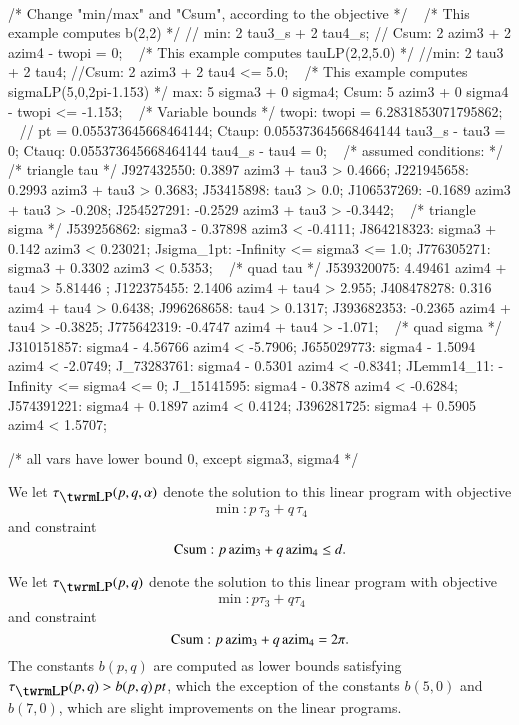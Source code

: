 { \obeylines\tt
  \hbox{}\parindent=4pt

 /* Change  "min/max" and "Csum", according to the objective */
 \ \hbox{}
 /* This example computes b(2,2) */
 // min: 2 tau3\_s + 2 tau4\_s;
 // Csum: 2 azim3 + 2 azim4 - twopi = 0;
 \ \hbox{}
 /* This example computes tauLP(2,2,5.0) */
 //min: 2 tau3 + 2 tau4;
 //Csum: 2 azim3 + 2 tau4 <= 5.0;
 \ \hbox{}
 /* This example computes sigmaLP(5,0,2pi-1.153) */
 max: 5 sigma3 + 0 sigma4;
 Csum: 5 azim3 + 0 sigma4 - twopi <= -1.153;
 \ \hbox{}
 /* Variable bounds */
 twopi: twopi =  6.2831853071795862;
 \ \hbox{}
 // pt = 0.055373645668464144;
 Ctaup: 0.055373645668464144 tau3\_s - tau3 = 0;
 Ctauq: 0.055373645668464144 tau4\_s - tau4 = 0;
 \ \hbox{}
 /* assumed conditions: */
 /* triangle tau */
 J927432550: 0.3897 azim3 + tau3 > 0.4666;
 J221945658: 0.2993 azim3 + tau3 > 0.3683;
 J53415898:  tau3 > 0.0;
 J106537269: -0.1689 azim3 + tau3 > -0.208;
 J254527291: -0.2529 azim3 + tau3 > -0.3442;
 \ \hbox{}
 /* triangle sigma */
 J539256862: sigma3 - 0.37898 azim3 < -0.4111;
 J864218323: sigma3 + 0.142 azim3 < 0.23021;
 Jsigma\_1pt: -Infinity <= sigma3 <= 1.0;
 J776305271: sigma3 + 0.3302 azim3 < 0.5353;
 \ \hbox{}
 /* quad  tau */
 J539320075: 4.49461 azim4 + tau4 > 5.81446 ;
 J122375455: 2.1406 azim4 + tau4 > 2.955;
 J408478278: 0.316 azim4 + tau4 > 0.6438;
 J996268658: tau4 > 0.1317;
 J393682353: -0.2365 azim4 + tau4 > -0.3825;
 J775642319: -0.4747 azim4 + tau4 > -1.071;
 \ \hbox{}
 /* quad sigma */
 J310151857: sigma4 - 4.56766 azim4 < -5.7906;
 J655029773: sigma4 - 1.5094 azim4 < -2.0749;
 J\_73283761:  sigma4 - 0.5301 azim4 < -0.8341;
 JLemm14\_11: -Infinity <= sigma4 <= 0;
 J\_15141595:  sigma4 - 0.3878 azim4 < -0.6284;
 J574391221: sigma4 + 0.1897 azim4 < 0.4124;
 J396281725: sigma4 + 0.5905 azim4 < 1.5707;
 \ \hbox{}

 /* all vars have lower bound 0, except sigma3, sigma4  */


}

\bigskip

We let $\tauLP(p,q,\alpha)$ denote the solution to this linear
program with objective $$\min: p\, \tau_3 + q\, \tau_4$$ and
constraint
$${\operatorname{Csum}}: p\, {\operatorname{azim}}_3 + q\,{\operatorname{azim}}_4 \le d.$$

We let $\tlp(p,q)$ denote the solution to this linear program with
objective $$\min: p \tau_3 + q \tau_4$$ and constraint
$${\operatorname{Csum}}: p\, {\operatorname{azim}}_3 + q\,{\operatorname{azim}}_4 =2\pi.$$  The constants $b(p,q)$
are computed as lower bounds satisfying $\tlp(p,q) > b(p,q)\,\pt$,
which the exception of the constants $b(5,0)$ and $b(7,0)$, which
are slight improvements on the linear programs.

